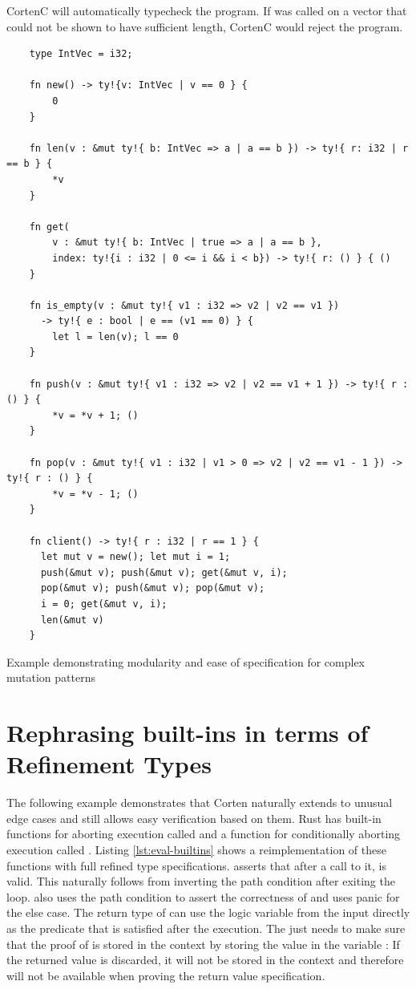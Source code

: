 \documentclass[twoside, english, final]{sdqthesis}
\theoremstyle{definition}
\begin{document}
CortenC will automatically typecheck the program. If  was called on a vector that could not be shown to have sufficient length, CortenC would reject the program.

\begin{listing}[h]
  \begin{verbatim}
    type IntVec = i32;

    fn new() -> ty!{v: IntVec | v == 0 } {
        0
    }

    fn len(v : &mut ty!{ b: IntVec => a | a == b }) -> ty!{ r: i32 | r == b } {
        *v
    }

    fn get(
        v : &mut ty!{ b: IntVec | true => a | a == b }, 
        index: ty!{i : i32 | 0 <= i && i < b}) -> ty!{ r: () } { ()
    }

    fn is_empty(v : &mut ty!{ v1 : i32 => v2 | v2 == v1 }) 
      -> ty!{ e : bool | e == (v1 == 0) } {
        let l = len(v); l == 0
    }

    fn push(v : &mut ty!{ v1 : i32 => v2 | v2 == v1 + 1 }) -> ty!{ r : () } {
        *v = *v + 1; ()
    }

    fn pop(v : &mut ty!{ v1 : i32 | v1 > 0 => v2 | v2 == v1 - 1 }) -> ty!{ r : () } {
        *v = *v - 1; ()
    }

    fn client() -> ty!{ r : i32 | r == 1 } {
      let mut v = new(); let mut i = 1;
      push(&mut v); push(&mut v); get(&mut v, i);
      pop(&mut v); push(&mut v); pop(&mut v);
      i = 0; get(&mut v, i);
      len(&mut v)
    }
  \end{verbatim}
  \caption{Example demonstrating modularity and ease of specification for complex mutation patterns}
  \label{lst:evaluation-vec}
\end{listing}


\section{Rephrasing built-ins in terms of Refinement Types}

The following example demonstrates that Corten naturally extends to unusual edge cases and still allows easy verification based on them.
Rust has built-in functions for aborting execution \- called  \- and a function for conditionally aborting execution \- called . Listing \ref{lst:eval-builtins} shows a reimplementation of these functions with full refined type specifications. 
 asserts that after a call to it,  is valid. This naturally follows from inverting the path condition after exiting the loop. 
 also uses the path condition to assert the correctness of  and uses panic for the else case. The return type of  can use the logic variable  from the input directly as the predicate that is satisfied after the execution.
The  just needs to make sure that the proof of  is stored in the context by storing the value in the variable : If the returned value is discarded, it will not be stored in the context and therefore will not be available when proving the return value specification.
\end{document}
